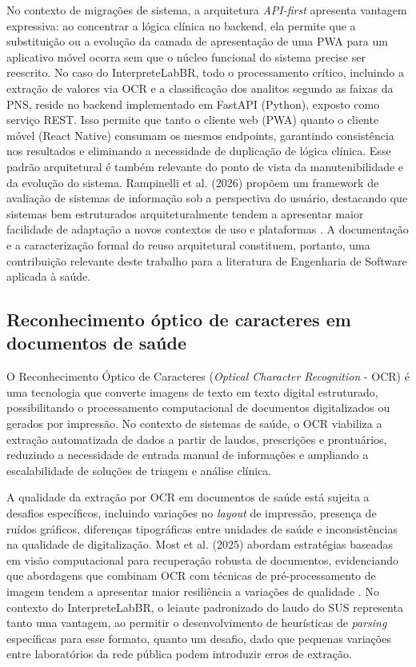 \documentclass[12pt]{article}
\begin{document}
No contexto de migrações de sistema, a arquitetura \emph{API-first} apresenta vantagem expressiva: ao concentrar a lógica clínica no backend, ela permite que a substituição ou a evolução da camada de apresentação de uma PWA para um aplicativo móvel ocorra sem que o núcleo funcional do sistema precise ser reescrito. No caso do InterpreteLabBR, todo o processamento crítico, incluindo a extração de valores via OCR e a classificação dos analitos segundo as faixas da PNS, reside no backend implementado em FastAPI (Python), exposto como serviço REST. Isso permite que tanto o cliente web (PWA) quanto o cliente móvel (React Native) consumam os mesmos endpoints, garantindo consistência nos resultados e eliminando a necessidade de duplicação de lógica clínica. Esse padrão arquitetural é também relevante do ponto de vista da manutenibilidade e da evolução do sistema. Rampinelli et al. (2026) propõem um framework de avaliação de sistemas de informação sob a perspectiva do usuário, destacando que sistemas bem estruturados arquiteturalmente tendem a apresentar maior facilidade de adaptação a novos contextos de uso e plataformas \cite{rampinelli2026}. A documentação e a caracterização formal do reuso arquitetural constituem, portanto, uma contribuição relevante deste trabalho para a literatura de Engenharia de Software aplicada à saúde.

\subsection{Reconhecimento óptico de caracteres em documentos de saúde}

O Reconhecimento Óptico de Caracteres (\emph{Optical Character Recognition} - OCR) é uma tecnologia que converte imagens de texto em texto digital estruturado, possibilitando o processamento computacional de documentos digitalizados ou gerados por impressão. No contexto de sistemas de saúde, o OCR viabiliza a extração automatizada de dados a partir de laudos, prescrições e prontuários, reduzindo a necessidade de entrada manual de informações e ampliando a escalabilidade de soluções de triagem e análise clínica.

A qualidade da extração por OCR em documentos de saúde está sujeita a desafios específicos, incluindo variações no \emph{layout} de impressão, presença de ruídos gráficos, diferenças tipográficas entre unidades de saúde e inconsistências na qualidade de digitalização. Most et al. (2025) abordam estratégias baseadas em visão computacional para recuperação robusta de documentos, evidenciando que abordagens que combinam OCR com técnicas de pré-processamento de imagem tendem a apresentar maior resiliência a variações de qualidade \cite{most2025}. No contexto do InterpreteLabBR, o leiaute padronizado do laudo do SUS representa tanto uma vantagem, ao permitir o desenvolvimento de heurísticas de \emph{parsing} específicas para esse formato, quanto um desafio, dado que pequenas variações entre laboratórios da rede pública podem introduzir erros de extração.
\end{document}
